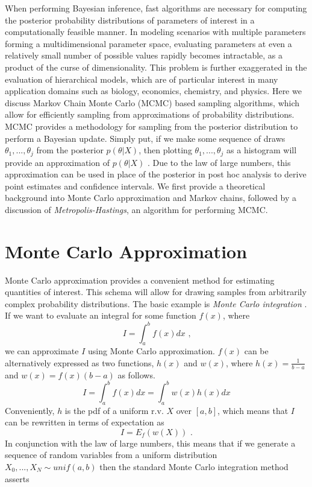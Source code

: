 \documentclass[
  12pt,
  twoside]{book}
\theoremstyle{definition}
\theoremstyle{definition}
\theoremstyle{definition}
\theoremstyle{remark}
\begin{document}
When performing Bayesian inference, fast algorithms are necessary for computing the posterior probability distributions of parameters of interest in a computationally feasible manner.
In modeling scenarios with multiple parameters forming a multidimensional parameter space, evaluating parameters at even a relatively small number of possible values rapidly becomes intractable, as a product of the curse of dimensionality.
This problem is further exaggerated in the evaluation of hierarchical models, which are of particular interest in many application domains such as biology, economics, chemistry, and physics.
Here we discuss Markov Chain Monte Carlo (MCMC) based sampling algorithms, which allow for efficiently sampling from approximations of probability distributions.
MCMC provides a methodology for sampling from the posterior distribution to perform a Bayesian update.
Simply put, if we make some sequence of draws \(\theta_1,...,\theta_j\) from the posterior \(p(\theta|X)\), then plotting \(\theta_1,...,\theta_j\) as a histogram will provide an approximation of \(p(\theta|X)\) \citep[  11.4]{Wasserman2004}.
Due to the law of large numbers, this approximation can be used in place of the posterior in post hoc analysis to derive point estimates and confidence intervals.
We first provide a theoretical background into Monte Carlo approximation and Markov chains, followed by a discussion of \emph{Metropolis-Hastings}, an algorithm for performing MCMC.

\hypertarget{monte-carlo-approximation}{%
\section{Monte Carlo Approximation}\label{monte-carlo-approximation}}

Monte Carlo approximation provides a convenient method for estimating quantities of interest.
This schema will allow for drawing samples from arbitrarily complex probability distributions.
The basic example is \emph{Monte Carlo integration} \citep[  24.2]{Wasserman2004}.
If we want to evaluate an integral for some function \(f(x)\), where
\[I=\int_{a}^{b}f(x)dx \textrm{ ,}\]
we can approximate \(I\) using Monte Carlo approximation. \(f(x)\) can be alternatively expressed as two functions, \(h(x)\) and \(w(x)\), where \(h(x)=\frac{1}{b-a}\) and \(w(x)=f(x)(b-a)\) as follows.
\[I=\int_{a}^{b}f(x)dx=\int_{a}^{b}w(x)h(x)dx\]
Conveniently, \(h\) is the pdf of a uniform r.v. \(X\) over \([a,b]\), which means that \(I\) can be rewritten in terms of expectation as
\[I=E_{f}(w(X)) \textrm{ .}\]
In conjunction with the law of large numbers, this means that if we generate a sequence of random variables from a uniform distribution \(X_{0},...,X_{N}\sim unif(a,b)\) then the standard Monte Carlo integration method asserts
\end{document}
